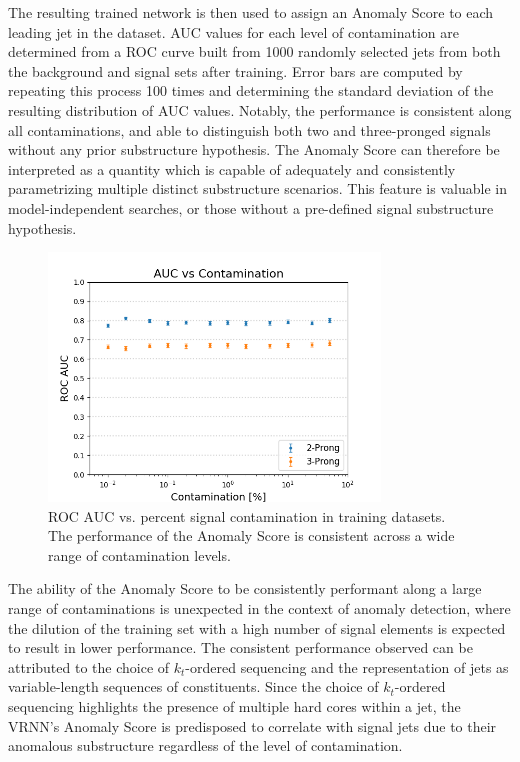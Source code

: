 \documentclass[11pt, a4paper]{article}
\begin{document}
The resulting trained network is then used to assign an Anomaly Score to each leading jet in the dataset. 
AUC values for each level of contamination are determined from a ROC curve built from 1000 randomly selected jets from both the background and signal sets after training.
Error bars are computed by repeating this process 100 times and determining the standard deviation of the resulting distribution of AUC values.
Notably, the performance is consistent along all contaminations, and able to distinguish both two and three-pronged signals without any prior substructure hypothesis. 
The Anomaly Score can therefore be interpreted as a quantity which is capable of adequately and consistently parametrizing multiple distinct substructure scenarios. 
This feature is valuable in model-independent searches, or those without a pre-defined signal substructure hypothesis. 

\begin{figure}[H]
	\begin{center}
		\includegraphics[width=250pt]{imgs/AUC_vs_Contam_Lead_SaveForPaper.png}
	\end{center}
	\caption{ROC AUC vs. percent signal contamination in training datasets. The performance of the Anomaly Score is consistent across a wide range of contamination levels.}
	\label{fig:aucs_vs_contam}
\end{figure}


The ability of the Anomaly Score to be consistently performant along a large range of contaminations is unexpected in the context of anomaly detection, where the dilution of the training set with a high number of signal elements is expected to result in lower performance.
The consistent performance observed can be attributed to the choice of $k_t$-ordered sequencing and the representation of jets as variable-length sequences of constituents. Since the choice of $k_t$-ordered sequencing highlights the presence of multiple hard cores within a jet, the VRNN's Anomaly Score is predisposed to correlate with signal jets due to their anomalous substructure regardless of the level of contamination.
\end{document}
